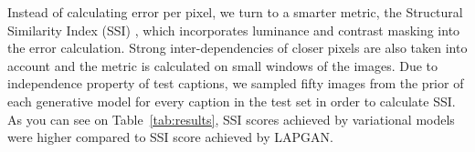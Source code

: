 \documentclass{article} %
\begin{document}
Instead of calculating error per pixel, we turn to a smarter metric, the Structural Similarity Index (SSI) \citep{wang_ssi}, which incorporates luminance and contrast masking into the error calculation. Strong inter-dependencies of closer pixels are also taken into account and the metric is calculated on small windows of the images. Due to independence property of test captions, we sampled fifty images from the prior of each generative model for every caption in the test set in order to calculate SSI. As you can see on Table~\ref{tab:results}, SSI scores achieved by variational models were higher compared to SSI score achieved by LAPGAN.

\end{document}
